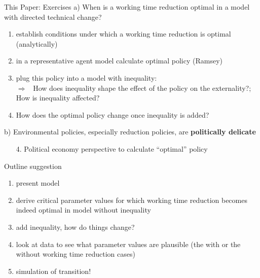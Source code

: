 \documentclass[11pt,aspectratio=169]{beamer}
\newcommand{\tr}[1]{\textcolor{blue}{#1}}
\newcommand{\ar}{$\Rightarrow$ \ }
\begin{document}
\begin{frame}{This Paper: Exercises}
	a) When is a working time reduction optimal in a model with directed technical change?
	\vspace{0mm}
	\begin{enumerate}
		\item establish conditions under which a working time reduction is optimal (analytically)
		\item in a representative agent model calculate optimal policy (Ramsey)
		\item plug this policy into a model with inequality: \\ 
		\ar How does inequality shape the effect of the policy on the externality?; How is inequality affected?
		\item How does the optimal policy change once inequality is added?
	\end{enumerate}
	b) Environmental policies, especially reduction policies, are \textbf{\alert{politically delicate}}
	\begin{enumerate}
		\item[4.] Political economy perspective to calculate ``optimal'' policy
	\end{enumerate}
\end{frame}

\begin{frame}{Outline suggestion}
\begin{enumerate}
\item present model
\item derive critical parameter values for which working time reduction becomes indeed optimal in model without inequality
\item add inequality, how do things change?
\item look at data to see what parameter values are plausible (the with or the without working time reduction cases)
\item simulation of transition! 
\end{enumerate}
\end{frame}
\end{document}
